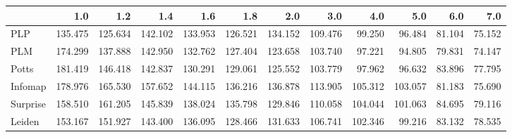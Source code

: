 \begin{tabular}{lrrrrrrrrrrr}
\toprule
{} &     1.0 &     1.2 &     1.4 &     1.6 &     1.8 &     2.0 &     3.0 &     4.0 &     5.0 &    6.0 &    7.0 \\
\midrule
PLP      & 135.475 & 125.634 & 142.102 & 133.953 & 126.521 & 134.152 & 109.476 &  99.250 &  96.484 & 81.104 & 75.152 \\
PLM      & 174.299 & 137.888 & 142.950 & 132.762 & 127.404 & 123.658 & 103.740 &  97.221 &  94.805 & 79.831 & 74.147 \\
Potts    & 181.419 & 146.418 & 142.837 & 130.291 & 129.061 & 125.552 & 103.779 &  97.962 &  96.632 & 83.896 & 77.795 \\
Infomap  & 178.976 & 165.530 & 157.652 & 144.115 & 136.216 & 136.878 & 113.905 & 105.312 & 103.057 & 81.183 & 75.690 \\
Surprise & 158.510 & 161.205 & 145.839 & 138.024 & 135.798 & 129.846 & 110.058 & 104.044 & 101.063 & 84.695 & 79.116 \\
Leiden   & 153.167 & 151.927 & 143.400 & 136.095 & 128.466 & 131.633 & 106.741 & 102.346 &  99.216 & 83.132 & 78.535 \\
\bottomrule
\end{tabular}
